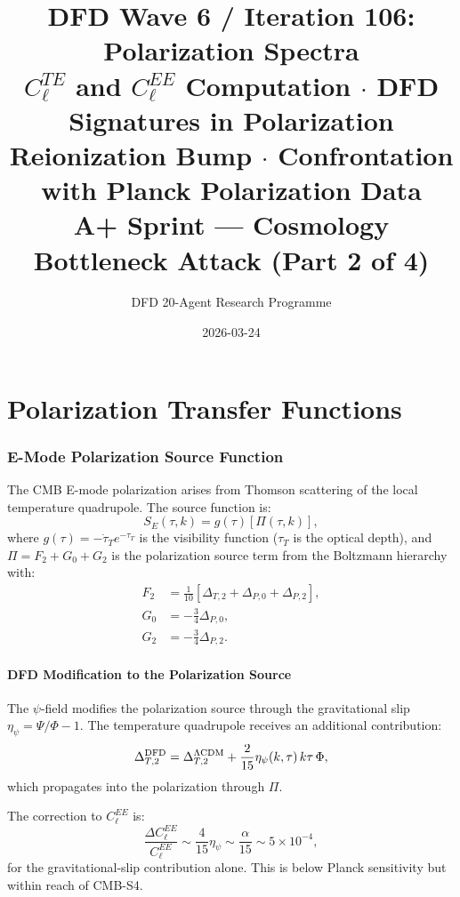 \documentclass[11pt,a4paper]{article}
\title{DFD Wave 6 / Iteration 106: Polarization Spectra\\[6pt]
\large $C_\ell^{TE}$ and $C_\ell^{EE}$ Computation $\cdot$ DFD Signatures in Polarization\\
Reionization Bump $\cdot$ Confrontation with Planck Polarization Data\\[6pt]
\normalsize A+ Sprint --- Cosmology Bottleneck Attack (Part 2 of 4)}
\author{DFD 20-Agent Research Programme}
\date{2026-03-24}
\theoremstyle{remark}
\begin{document}
\maketitle
\tableofcontents
\newpage

\part{Polarization Transfer Functions}
\label{part:polarization-transfer}

\section{E-Mode Polarization Source Function}

The CMB E-mode polarization arises from Thomson scattering of the local
temperature quadrupole. The source function is:
\begin{equation}
S_E(\tau, k) = g(\tau)\left[\Pi(\tau, k)\right],
\label{eq:SE}
\end{equation}
where $g(\tau) = -\dot\tau_T e^{-\tau_T}$ is the visibility function
($\tau_T$ is the optical depth), and $\Pi = F_2 + G_0 + G_2$ is the
polarization source term from the Boltzmann hierarchy with:
\begin{align}
F_2 &= \frac{1}{10}\left[\Delta_{T,2} + \Delta_{P,0} + \Delta_{P,2}\right], \\
G_0 &= -\frac{3}{4}\Delta_{P,0}, \\
G_2 &= -\frac{3}{4}\Delta_{P,2}.
\end{align}

\subsection{DFD Modification to the Polarization Source}

The $\psi$-field modifies the polarization source through the gravitational
slip $\eta_\psi = \Psi/\Phi - 1$. The temperature quadrupole receives
an additional contribution:
\begin{equation}
\Delta_{T,2}^{\rm DFD} = \Delta_{T,2}^{\Lambda\rm CDM}
+ \frac{2}{15}\eta_\psi(k, \tau)\,k\tau\,\Phi,
\label{eq:quadrupole-correction}
\end{equation}
which propagates into the polarization through $\Pi$.

The correction to $C_\ell^{EE}$ is:
\begin{equation}
\frac{\Delta C_\ell^{EE}}{C_\ell^{EE}} \sim \frac{4}{15}\eta_\psi
\sim \frac{\alpha}{15} \sim 5 \times 10^{-4},
\end{equation}
for the gravitational-slip contribution alone. This is below Planck
sensitivity but within reach of CMB-S4.
\end{document}
